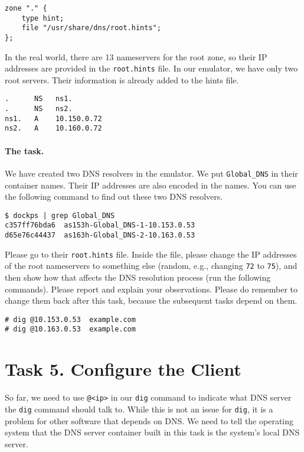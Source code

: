\begin{lstlisting}
zone "." {
	type hint;
	file "/usr/share/dns/root.hints";
};
\end{lstlisting}

In the real world, there are 13 nameservers for the root zone, 
so their IP addresses are provided in the \texttt{root.hints} file. 
In our emulator, we have only two root servers. Their 
information is already added to the hints file. 

\begin{lstlisting}
.      NS   ns1.
.      NS   ns2.
ns1.   A    10.150.0.72
ns2.   A    10.160.0.72
\end{lstlisting}
 


\paragraph{The task.} We have created two DNS resolvers in the emulator. 
We put \texttt{Global\_DNS} in
their container names. Their IP addresses are also encoded in the names.
You can use the following command to find out these two DNS resolvers.

\begin{lstlisting}
$ dockps | grep Global_DNS
c357ff76bda6  as153h-Global_DNS-1-10.153.0.53
d65e76c44437  as163h-Global_DNS-2-10.163.0.53
\end{lstlisting}


Please go to their \texttt{root.hints} file.
Inside the file, please change the IP addresses of the root nameservers 
to something else (random, e.g., changing \texttt{72} to \texttt{75}), 
and then show how that affects
the DNS resolution process (run the following commands). 
Please report and explain your observations. 
Please do remember to change them back after this task,
because the subsequent tasks depend on them.

\begin{lstlisting}
# dig @10.153.0.53  example.com
# dig @10.163.0.53  example.com
\end{lstlisting}
 



\section{Task 5. Configure the Client} 

So far, we need to use \texttt{@<ip>} in our \texttt{dig} command
to indicate what DNS server the \texttt{dig} command should talk to. While this
is not an issue for \texttt{dig}, it is a problem for other software that
depends on DNS. We need to tell the operating system that the
DNS server container built in this task is the system's
local DNS server.

